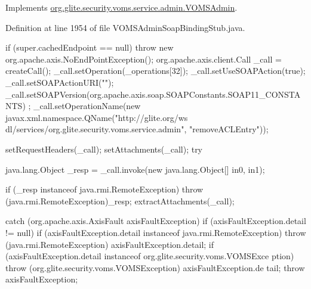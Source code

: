 \label{classorg_1_1glite_1_1security_1_1voms_1_1service_1_1admin_1_1VOMSAdminSoapBindingStub_adb006760079dca396aca41278068c65e}


Implements \hyperlink{interfaceorg_1_1glite_1_1security_1_1voms_1_1service_1_1admin_1_1VOMSAdmin_ae6dd61d2a72a363eaaca5cdf4fe02a6a}{org.glite.security.voms.service.admin.VOMSAdmin}.



Definition at line 1954 of file VOMSAdminSoapBindingStub.java.


\begin{DoxyCode}
                                                                                 
                                                                                       
      {
        if (super.cachedEndpoint == null) {
            throw new org.apache.axis.NoEndPointException();
        }
        org.apache.axis.client.Call _call = createCall();
        _call.setOperation(_operations[32]);
        _call.setUseSOAPAction(true);
        _call.setSOAPActionURI("");
        _call.setSOAPVersion(org.apache.axis.soap.SOAPConstants.SOAP11_CONSTANTS)
      ;
        _call.setOperationName(new javax.xml.namespace.QName("http://glite.org/ws
      dl/services/org.glite.security.voms.service.admin", "removeACLEntry"));

        setRequestHeaders(_call);
        setAttachments(_call);
 try {        java.lang.Object _resp = _call.invoke(new java.lang.Object[] {in0, 
      in1});

        if (_resp instanceof java.rmi.RemoteException) {
            throw (java.rmi.RemoteException)_resp;
        }
        extractAttachments(_call);
  } catch (org.apache.axis.AxisFault axisFaultException) {
    if (axisFaultException.detail != null) {
        if (axisFaultException.detail instanceof java.rmi.RemoteException) {
              throw (java.rmi.RemoteException) axisFaultException.detail;
         }
        if (axisFaultException.detail instanceof org.glite.security.voms.VOMSExce
      ption) {
              throw (org.glite.security.voms.VOMSException) axisFaultException.de
      tail;
         }
   }
  throw axisFaultException;
}
    }
\end{DoxyCode}
